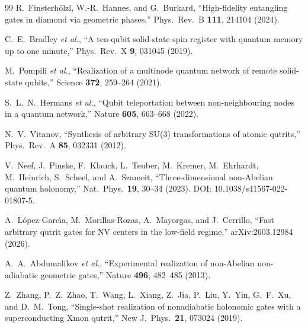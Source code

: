 \documentclass[11pt,letterpaper]{article}
\begin{document}
\begin{thebibliography}{99}
R.~Finsterh\"{o}lzl, W.-R.~Hannes, and G.~Burkard,
``High-fidelity entangling gates in diamond via geometric phases,''
Phys.\ Rev.\ B \textbf{111}, 214104 (2024).

C.~E.~Bradley \textit{et al.},
``A ten-qubit solid-state spin register with quantum memory up to one minute,''
Phys.\ Rev.\ X \textbf{9}, 031045 (2019).

M.~Pompili \textit{et al.},
``Realization of a multinode quantum network of remote solid-state qubits,''
Science \textbf{372}, 259--264 (2021).

S.~L.~N.~Hermans \textit{et al.},
``Qubit teleportation between non-neighbouring nodes in a quantum network,''
Nature \textbf{605}, 663--668 (2022).


N.~V.~Vitanov,
``Synthesis of arbitrary SU(3) transformations of atomic qutrits,''
Phys.\ Rev.\ A \textbf{85}, 032331 (2012).

V.~Neef, J.~Pinske, F.~Klauck, L.~Teuber, M.~Kremer, M.~Ehrhardt, M.~Heinrich, S.~Scheel, and A.~Szameit,
``Three-dimensional non-Abelian quantum holonomy,''
Nat.\ Phys.\ \textbf{19}, 30--34 (2023).
DOI: 10.1038/s41567-022-01807-5.

A.~L\'{o}pez-Garc\'{\i}a, M.~Morillas-Rozas, A.~Mayorgas, and J.~Cerrillo,
``Fast arbitrary qutrit gates for NV centers in the low-field regime,''
arXiv:2603.12984 (2026).

A.~A.~Abdumalikov \textit{et al.},
``Experimental realization of non-Abelian non-adiabatic geometric gates,''
Nature \textbf{496}, 482--485 (2013).

Z.~Zhang, P.~Z.~Zhao, T.~Wang, L.~Xiang, Z.~Jia, P.~Liu, Y.~Yin, G.~F.~Xu, and D.~M.~Tong,
``Single-shot realization of nonadiabatic holonomic gates with a superconducting Xmon qutrit,''
New J.\ Phys.\ \textbf{21}, 073024 (2019).


\end{thebibliography}
\end{document}
